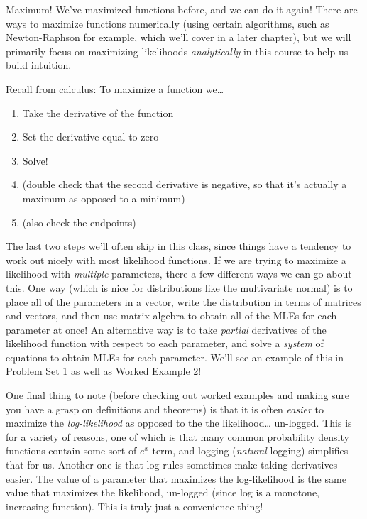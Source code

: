 \documentclass[
  letterpaper,
  DIV=11,
  numbers=noendperiod]{scrreprt}
\begin{document}
Maximum! We've maximized functions before, and we can do it again! There
are ways to maximize functions numerically (using certain algorithms,
such as Newton-Raphson for example, which we'll cover in a later
chapter), but we will primarily focus on maximizing likelihoods
\emph{analytically} in this course to help us build intuition.

Recall from calculus: To maximize a function we\ldots{}

\begin{enumerate}
\def\labelenumi{\arabic{enumi}.}
\item
  Take the derivative of the function
\item
  Set the derivative equal to zero
\item
  Solve!
\item
  (double check that the second derivative is negative, so that it's
  actually a maximum as opposed to a minimum)
\item
  (also check the endpoints)
\end{enumerate}

The last two steps we'll often skip in this class, since things have a
tendency to work out nicely with most likelihood functions. If we are
trying to maximize a likelihood with \emph{multiple} parameters, there a
few different ways we can go about this. One way (which is nice for
distributions like the multivariate normal) is to place all of the
parameters in a vector, write the distribution in terms of matrices and
vectors, and then use matrix algebra to obtain all of the MLEs for each
parameter at once! An alternative way is to take \emph{partial}
derivatives of the likelihood function with respect to each parameter,
and solve a \emph{system} of equations to obtain MLEs for each
parameter. We'll see an example of this in Problem Set 1 as well as
Worked Example 2!

One final thing to note (before checking out worked examples and making
sure you have a grasp on definitions and theorems) is that it is often
\emph{easier} to maximize the \emph{log-likelihood} as opposed to the
the likelihood\ldots{} un-logged. This is for a variety of reasons, one
of which is that many common probability density functions contain some
sort of \(e^x\) term, and logging (\emph{natural} logging) simplifies
that for us. Another one is that log rules sometimes make taking
derivatives easier. The value of a parameter that maximizes the
log-likelihood is the same value that maximizes the likelihood,
un-logged (since log is a monotone, increasing function). This is truly
just a convenience thing!
\end{document}
